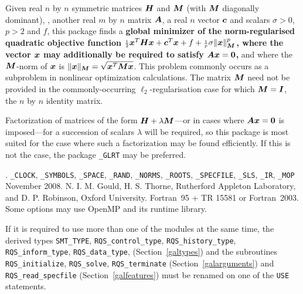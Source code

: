 \documentclass{galahad}
\newcommand{\packagename}{RQS}
\newcommand{\fullpackagename}{\libraryname\_\packagename}
\begin{document}
\galheader


\galsummary
Given real $n$ by $n$ symmetric matrices ${\bm{H}}$ and ${\bm{M}}$
(with ${\bm{M}}$ diagonally dominant), , another real $m$ by $n$ matrix ${\bm{A}}$,
a real $n$ vector ${\bm{c}}$ and scalars $\sigma>0$, $p>2$ and $f$, this package
finds a {\bf global minimizer of the norm-regularised quadratic objective
function
${\scriptstyle \frac{1}{2}} {\bm{x}}^T {\bm{H}} {\bm{x}}  +  {\bm{c}}^T {\bm{x}} + f
 + {\scriptstyle \frac{1}{p}} \sigma \|{\bm{x}}\|_{{\bm{M}}}^p$,
where the vector ${\bm{x}}$ may additionally be required to satisfy
${\bm{A}} {\bm{x}} = {\bm{0}}$,} and
where the ${\bm{M}}$-norm of ${\bm{x}}$ is $\|{\bm{x}}\|_{{\bm{M}}} = \sqrt{{\bm{x}}^T {\bm{M}} {\bm{x}}}$.
This problem commonly occurs as a subproblem in nonlinear
optimization calculations.
The matrix ${\bm{M}}$ need not be provided in the commonly-occurring
$\ell_2$-regularisation case for which ${\bm{M}} = {\bm{I}}$, the $n$ by $n$
identity matrix.

\noindent
Factorization of matrices of the form ${\bm{H}} + \lambda {\bm{M}}$---or
in cases where ${\bm{A}} {\bm{x}} = {\bm{0}}$ is imposed---for a succession
of scalars $\lambda$ will be required, so this package is most suited
for the case where such a factorization may be found efficiently. If
this is not the case, the package {\tt \libraryname\_GLRT} may be preferred.


\galattributes
\galversions{\tt  \fullpackagename\_single, \fullpackagename\_double}.
\galuses
{\tt \libraryname\_CLOCK},
{\tt \libraryname\_SY\-M\-BOLS},
{\tt \libraryname\_SPACE}, {\tt \libraryname\_\-RAND},
{\tt \libraryname\_\-NORMS},
{\tt \libraryname\_ROOTS}, {\tt \libraryname\_SPECFILE},
{\tt \libraryname\_SLS}, {\tt \libraryname\_IR},
{\tt \libraryname\_MOP}
\galdate November 2008.
\galorigin N. I. M. Gould, H. S. Thorne, Rutherford Appleton Laboratory,
and D. P. Robinson, Oxford University.
\gallanguage Fortran~95 + TR 15581 or Fortran~2003.
\galparallelism Some options may use OpenMP and its runtime library.


\galhowto



\noindent
If it is required to use more than one of the modules at the same time, 
the derived types
{\tt SMT\_TYPE},
{\tt \packagename\_control\_type},
{\tt \packagename\_history\_\-type},
{\tt \packagename\_inform\_type},
{\tt \packagename\_data\_type},
(Section~\ref{galtypes})
and the subroutines
{\tt \packagename\_initialize},
{\tt \packagename\_solve}, {\tt \packagename\_\-terminate}
(Section~\ref{galarguments})
and
{\tt \packagename\_read\_specfile}
(Section~\ref{galfeatures})
must be renamed on one of the {\tt USE} statements.
\end{document}
